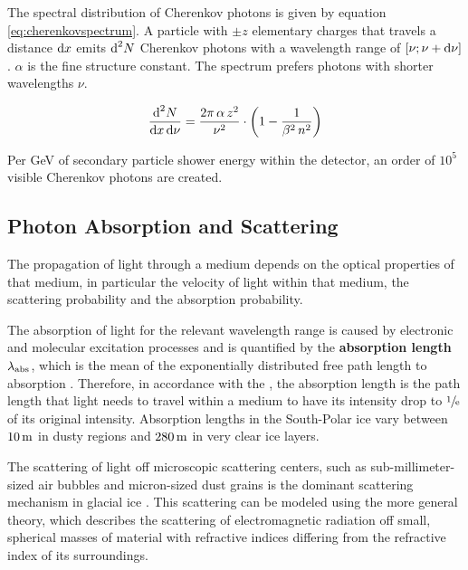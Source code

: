 The spectral distribution of Cherenkov photons is given by equation
\ref{eq:cherenkovspectrum}. A particle with \(\pm z\) elementary charges
that travels a distance \(\text{d} x\) emits \(\text{d}^2 N\) Cherenkov photons with
a wavelength range of \([\nu; \nu + \text{d}\nu]\). \(\alpha\) is the fine
structure constant. \cite{katz2012} The spectrum prefers photons with
shorter wavelengths \(\nu\).

\begin{equation}
  \frac{\text{d}^2 N}{\text{d} x\,\text{d}\nu} = \frac{2\pi\,\alpha\,z^2}{\nu^2}\cdot
  \left( 1 - \frac{1}{\beta^2\,n^2} \right)
  \label{eq:cherenkovspectrum}
\end{equation}

Per GeV of secondary particle shower energy within the detector, an
order of \(10^5\)\nbsp visible Cherenkov photons are created.
\cite{instrumentation}

\subsection{Photon Absorption and Scattering}
\label{sec:scattering}

The propagation of light through a medium depends on the optical
properties of that medium, in particular the velocity of light within
that medium, the scattering probability and the absorption probability.
\cite{lundberg}

The absorption of light for the relevant wavelength range is caused by
electronic and molecular excitation processes \cite{lundberg} and is
quantified by the \textbf{absorption length} \(\lambda_\text{abs}\), which is
the mean of the exponentially distributed free path length to absorption
\cite{lundberg}. Therefore, in accordance with the
, the absorption length is the path length that
light needs to travel within a medium to have its intensity drop to
\(\sfrac{1}{\mathrm{e}}\) of its original intensity. \cite{lexikonderphysik}
Absorption lengths in the South-Polar ice vary between \(10\text{\,m}\) in dusty
regions and \(280\text{\,m}\) in very clear ice layers.
\cite{ackermann, ppcpaper, icepaper}

The scattering of light off microscopic scattering centers, such as
sub-millimeter-sized air bubbles and micron-sized dust grains
\cite{Price1997, ackermann} is the dominant scattering mechanism in
glacial ice \cite{Askebjer1997, lundberg}. This scattering can be
modeled using the more general  theory, which
describes the scattering of electromagnetic radiation off small,
spherical masses of material with refractive indices differing from the
refractive index of its surroundings.
\cite{Mie1908, ackermann, lundberg}

